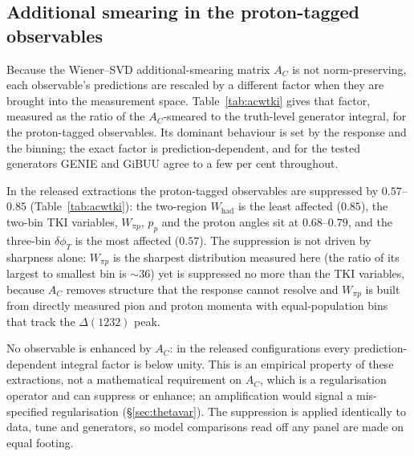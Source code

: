 \documentclass[11pt,a4paper]{article}
\begin{document}
\subsection{Additional smearing in the proton-tagged observables}
\label{sec:acwtki}

Because the Wiener--SVD additional-smearing matrix $A_C$ is not norm-preserving, each
observable's predictions are rescaled by a different factor when they are brought into the
measurement space. Table~\ref{tab:acwtki} gives that factor, measured as the ratio of the
$A_C$-smeared to the truth-level generator integral, for the proton-tagged observables.
Its dominant behaviour is set by the response and the binning; the exact factor is
prediction-dependent, and for the tested generators GENIE and GiBUU agree to a few per
cent throughout.

In the released extractions the proton-tagged observables are suppressed by $0.57$--$0.85$
(Table~\ref{tab:acwtki}): the two-region $W_\mathrm{had}$ is the least affected ($0.85$), the
two-bin TKI variables, $W_{\pi p}$, $p_p$ and the proton angles sit at $0.68$--$0.79$, and the
three-bin $\delta\phi_T$ is the most affected ($0.57$). The suppression is not driven by sharpness alone: $W_{\pi p}$ is the sharpest
distribution measured here (the ratio of its largest to smallest bin is $\sim\!36$) yet is
suppressed no more than the TKI variables, because $A_C$ removes structure that the
response cannot resolve and $W_{\pi p}$ is built from directly measured pion and
proton momenta with equal-population bins that track the $\Delta(1232)$ peak.

No observable is enhanced by $A_C$: in the released configurations every
prediction-dependent integral factor is below unity. This is an empirical property of these
extractions, not a mathematical requirement on $A_C$, which is a regularisation operator and
can suppress or enhance; an amplification would signal a mis-specified regularisation
(\S\ref{sec:thetavar}). The suppression is applied identically to data, tune and generators, so model
comparisons read off any panel are made on equal footing.
\end{document}
